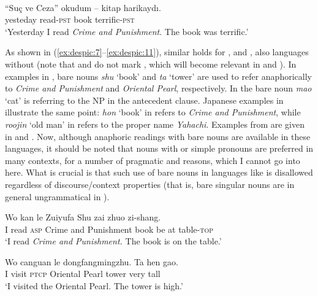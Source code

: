 \documentclass[output=paper,
modfonts
]{langscibook}
\begin{document}
	\ea \label{ex:despic:6}
	 \\
	         {``Su\c c      ve   Ceza''}          {okudum} --   {kitap} {harikayd\i}.\\
	yesteday \phantom{``}{Crime and Punishment} read-\textsc{pst} {} book terrific-\textsc{pst}\\ 
	\glt `Yesterday I read \textit{Crime and Punishment}. The book was terrific.'
	\z 
	
	
	As shown in (\ref{ex:despic:7}--\ref{ex:despic:11}), similar holds for ,  and , also languages without  (note that  and  do not mark , which will become relevant in   and ). In  examples in , bare nouns \textit{shu} `book' and \textit{ta} `tower' are used to refer anaphorically to \textit{Crime and Punishment} and \textit{Oriental Pearl}, respectively. In  the bare noun \textit{mao} `cat' is referring to the NP in the antecedent clause. Japanese examples in  illustrate the same point: \textit{hon} `book' in  refers to \textit{Crime and Punishment}, while \textit{roojin} `old man' in  refers to the proper name \textit{Yahachi}. Examples from  are given in  and . Now, although anaphoric readings with bare nouns are available in these languages, it should be noted that nouns with  or simple pronouns are preferred in many contexts, for a number of pragmatic and  reasons, which I cannot go into here. What is crucial is that such use of bare nouns in languages like  is disallowed regardless of discourse/context properties (that is, bare singular nouns are in general ungrammatical in ).
	
	
	\ea \label{ex:despic:7} 
	\ea \label{ex:despic:7a}
	\gll 
	{Wo} {kan} {le} {Zuiyufa} {Shu} {zai} {zhuo} {zi-shang.} \\
	I read \textsc{asp} {Crime and Punishment} book be at table-\textsc{top} \\
	\glt `I read \textit{Crime and Punishment.} The book is on the table.'
	
	\ex \label{ex:despic:7b}
	\gll 
	{Wo} {canguan} {le} {dongfangmingzhu}. {Ta} {hen} {gao.} \\
	I visit \textsc{ptcp} {Oriental Pearl} tower very tall \\
	\glt `I visited the Oriental Pearl. The tower is high.'
	\z 
	\z
	
\end{document}
